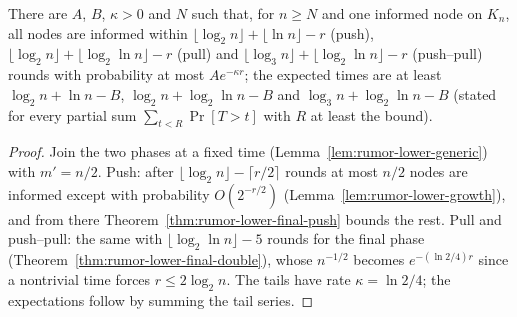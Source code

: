 \begin{theorem}\label{thm:rumor-protocols-lower}
\leanok{}
There are $A$, $B$, $\kappa>0$ and $N$ such that, for $n\ge N$ and one informed node on $K_n$, all
nodes are informed within $\lfloor\log_2n\rfloor+\lfloor\ln n\rfloor-r$ (push),
$\lfloor\log_2n\rfloor+\lfloor\log_2\ln n\rfloor-r$ (pull) and
$\lfloor\log_3n\rfloor+\lfloor\log_2\ln n\rfloor-r$ (push--pull) rounds with probability at most
$Ae^{-\kappa r}$; the expected times are at least $\log_2n+\ln n-B$, $\log_2n+\log_2\ln n-B$ and
$\log_3n+\log_2\ln n-B$ (stated for every partial sum $\sum_{t<R}\Pr[T>t]$ with $R$ at least the
bound).
\end{theorem}
\begin{proof}\leanok
Join the two phases at a fixed time (Lemma~\ref{lem:rumor-lower-generic}) with $m'=n/2$. Push:
after $\lfloor\log_2n\rfloor-\lceil r/2\rceil$ rounds at most $n/2$ nodes are informed except with
probability $O(2^{-r/2})$ (Lemma~\ref{lem:rumor-lower-growth}), and from there
Theorem~\ref{thm:rumor-lower-final-push} bounds the rest. Pull and push--pull: the same with
$\lfloor\log_2\ln n\rfloor-5$ rounds for the final phase (Theorem~\ref{thm:rumor-lower-final-double}),
whose $n^{-1/2}$ becomes $e^{-(\ln2/4)r}$ since a nontrivial time forces $r\le2\log_2n$. The tails
have rate $\kappa=\ln2/4$; the expectations follow by summing the tail series.
\end{proof}

